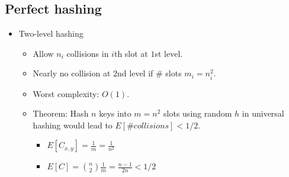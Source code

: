 \documentclass[twocolumn]{article}
\begin{document}

\subsection{Perfect hashing}
\begin{itemize}
\item Two-level hashing
  \begin{itemize}
  \item Allow $n_i$ collisions in $i$th slot at $1$st level.
  \item Nearly no collision at $2$nd level if \# slots $m_i=n_i^2$.
  \item Worst complexity: $O(1)$.
  \item Theorem: Hash $n$ keys into $m=n^2$ slots using random $h$ in universal hashing would lead to $E[\#collisions] < 1/2$.
    \begin{itemize}
    \item $E[C_{x,y}] = \frac{1}{m} = \frac{1}{n^2}$
    \item $E[C] = \binom{n}{2} \frac{1}{m} = \frac{n-1}{2n} < 1/2$
    \end{itemize}
  \end{itemize}
\end{itemize}

\end{document}
